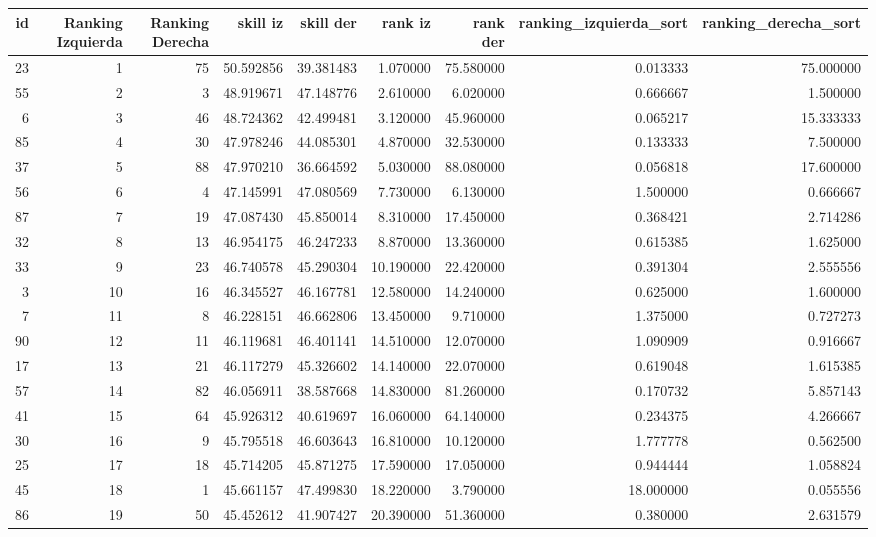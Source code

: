 \begin{tabular}{rrrrrrrrr}
\toprule
id & Ranking Izquierda & Ranking Derecha & skill iz & skill der & rank iz & rank der & ranking_izquierda_sort & ranking_derecha_sort \\
\midrule
23 & 1 & 75 & 50.592856 & 39.381483 & 1.070000 & 75.580000 & 0.013333 & 75.000000 \\
55 & 2 & 3 & 48.919671 & 47.148776 & 2.610000 & 6.020000 & 0.666667 & 1.500000 \\
6 & 3 & 46 & 48.724362 & 42.499481 & 3.120000 & 45.960000 & 0.065217 & 15.333333 \\
85 & 4 & 30 & 47.978246 & 44.085301 & 4.870000 & 32.530000 & 0.133333 & 7.500000 \\
37 & 5 & 88 & 47.970210 & 36.664592 & 5.030000 & 88.080000 & 0.056818 & 17.600000 \\
56 & 6 & 4 & 47.145991 & 47.080569 & 7.730000 & 6.130000 & 1.500000 & 0.666667 \\
87 & 7 & 19 & 47.087430 & 45.850014 & 8.310000 & 17.450000 & 0.368421 & 2.714286 \\
32 & 8 & 13 & 46.954175 & 46.247233 & 8.870000 & 13.360000 & 0.615385 & 1.625000 \\
33 & 9 & 23 & 46.740578 & 45.290304 & 10.190000 & 22.420000 & 0.391304 & 2.555556 \\
3 & 10 & 16 & 46.345527 & 46.167781 & 12.580000 & 14.240000 & 0.625000 & 1.600000 \\
7 & 11 & 8 & 46.228151 & 46.662806 & 13.450000 & 9.710000 & 1.375000 & 0.727273 \\
90 & 12 & 11 & 46.119681 & 46.401141 & 14.510000 & 12.070000 & 1.090909 & 0.916667 \\
17 & 13 & 21 & 46.117279 & 45.326602 & 14.140000 & 22.070000 & 0.619048 & 1.615385 \\
57 & 14 & 82 & 46.056911 & 38.587668 & 14.830000 & 81.260000 & 0.170732 & 5.857143 \\
41 & 15 & 64 & 45.926312 & 40.619697 & 16.060000 & 64.140000 & 0.234375 & 4.266667 \\
30 & 16 & 9 & 45.795518 & 46.603643 & 16.810000 & 10.120000 & 1.777778 & 0.562500 \\
25 & 17 & 18 & 45.714205 & 45.871275 & 17.590000 & 17.050000 & 0.944444 & 1.058824 \\
45 & 18 & 1 & 45.661157 & 47.499830 & 18.220000 & 3.790000 & 18.000000 & 0.055556 \\
86 & 19 & 50 & 45.452612 & 41.907427 & 20.390000 & 51.360000 & 0.380000 & 2.631579 \\

\end{tabular}
